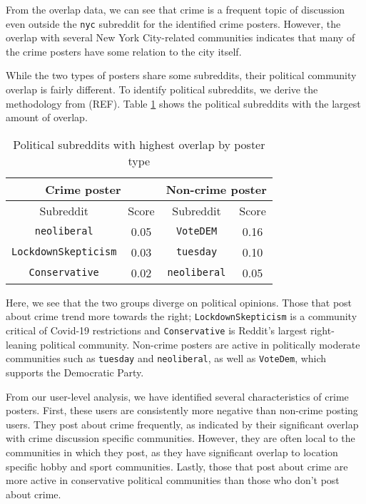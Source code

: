 \documentclass[12pt,oneside, letterpaper]{book}
\begin{document}
\par From the overlap data, we can see that crime is a frequent topic of discussion even outside the \texttt{nyc} subreddit for the identified crime posters. However, the overlap with several New York City-related communities indicates that many of the crime posters have some relation to the city itself.

\par While the two types of posters share some subreddits, their political community overlap is fairly different. To identify political subreddits, we derive the methodology from (REF). Table \ref{table:table-8} shows the political subreddits with the largest amount of overlap.

\begin{table}[h!]
    \centering
    \small
    \caption{Political subreddits with highest overlap by poster type}
    \begin{tabular}{| c | c | c | c |}
    \hline
    \multicolumn{2}{|c|}{Crime poster} & \multicolumn{2}{|c|}{Non-crime poster} \\ \hline
    Subreddit & Score & Subreddit & Score\\ \hline
    \texttt{neoliberal} & 0.05 & \texttt{VoteDEM} & 0.16 \\ \hline
    \texttt{LockdownSkepticism} & 0.03 & \texttt{tuesday} & 0.10 \\ \hline
    \texttt{Conservative} & 0.02 & \texttt{neoliberal} & 0.05 \\ \hline
	\end{tabular}
	\label{table:table-8}
\end{table}

\par Here, we see that the two groups diverge on political opinions. Those that post about crime trend more towards the right; \texttt{LockdownSkepticism} is a community critical of Covid-19 restrictions and \texttt{Conservative} is Reddit's largest right-leaning political community. Non-crime posters are active in politically moderate communities such as \texttt{tuesday} and \texttt{neoliberal}, as well as \texttt{VoteDem}, which supports the Democratic Party.

\par From our user-level analysis, we have identified several characteristics of crime posters. First, these users are consistently more negative than non-crime posting users. They post about crime frequently, as indicated by their significant overlap with crime discussion specific communities. However, they are often local to the communities in which they post, as they have significant overlap to location specific hobby and sport communities. Lastly, those that post about crime are more active in conservative political communities than those who don't post about crime.
\end{document}
